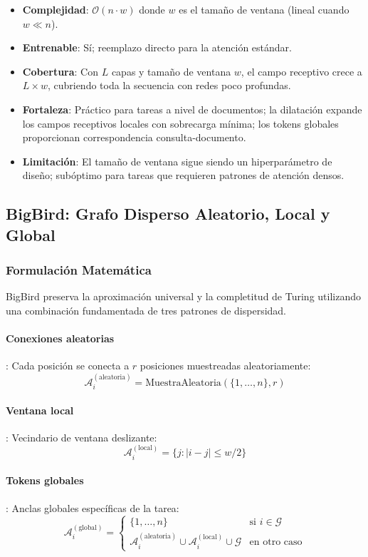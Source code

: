 \documentclass[11pt,a4paper]{article}
\begin{document}
\begin{itemize}[leftmargin=*]
    \item \textbf{Complejidad}: $\mathcal{O}(n \cdot w)$ donde $w$ es el tamaño de ventana (lineal cuando $w \ll n$).
    \item \textbf{Entrenable}: Sí; reemplazo directo para la atención estándar.
    \item \textbf{Cobertura}: Con $L$ capas y tamaño de ventana $w$, el campo receptivo crece a $L \times w$, cubriendo toda la secuencia con redes poco profundas.
    \item \textbf{Fortaleza}: Práctico para tareas a nivel de documentos; la dilatación expande los campos receptivos locales con sobrecarga mínima; los tokens globales proporcionan correspondencia consulta-documento.
    \item \textbf{Limitación}: El tamaño de ventana sigue siendo un hiperparámetro de diseño; subóptimo para tareas que requieren patrones de atención densos.
\end{itemize}

\subsection{BigBird: Grafo Disperso Aleatorio, Local y Global}

\subsubsection{Formulación Matemática}

BigBird \citep{zaheer_bigbird_2020} preserva la aproximación universal y la completitud de Turing utilizando una combinación fundamentada de tres patrones de dispersidad.

\paragraph{Conexiones aleatorias}: Cada posición se conecta a $r$ posiciones muestreadas aleatoriamente:
\[
\mathcal{A}_i^{(\text{aleatoria})} = \text{MuestraAleatoria}(\{1, \ldots, n\}, r)
\]

\paragraph{Ventana local}: Vecindario de ventana deslizante:
\[
\mathcal{A}_i^{(\text{local})} = \{j : |i-j| \leq w/2\}
\]

\paragraph{Tokens globales}: Anclas globales específicas de la tarea:
\[
\mathcal{A}_i^{(\text{global})} = \begin{cases}
\{1, \ldots, n\} & \text{si } i \in \mathcal{G} \\
\mathcal{A}_i^{(\text{aleatoria})} \cup \mathcal{A}_i^{(\text{local})} \cup \mathcal{G} & \text{en otro caso}
\end{cases}
\]
\end{document}
